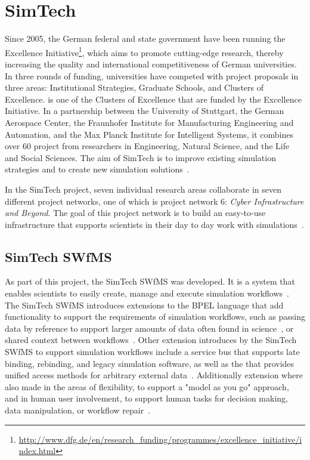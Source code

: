\section{SimTech}
\label{fundamentals:simtech}

Since 2005, the German federal and state government have been running the Excellence Initiative\footnote{\url{http://www.dfg.de/en/research_funding/programmes/excellence_initiative/index.html}}, which aims to promote cutting-edge research, thereby increasing the quality and international competitiveness of German universities.
In three rounds of funding, universities have competed with project proposals in three areas: Institutional Strategies, Graduate Schools, and Clusters of Excellence.
 is one of the Clusters of Excellence that are funded by the Excellence Initiative.
In a partnership between the University of Stuttgart, the German Aerospace Center, the Fraunhofer Institute for Manufacturing Engineering and Automation, and the Max Planck Institute for Intelligent Systems, it combines over 60 project from researchers in Engineering, Natural Science, and the Life and Social Sciences.
The aim of SimTech is to improve existing simulation strategies and to create new simulation solutions~\autocite{excellence:glance}.

In the SimTech project, seven individual research areas collaborate in seven different project networks, one of which is project network 6: \textit{Cyber Infrastructure and Beyond}.
The goal of this project network is to build an easy-to-use infrastructure that supports scientists in their day to day work with simulations~\autocite{simtech:projectnetwork6}.

\subsection{SimTech SWfMS}

As part of this project, the SimTech SWfMS was developed.
It is a system that enables scientists to easily create, manage and execute simulation workflows~\autocite{workflow:simulation:flexibility}.
The SimTech SWfMS introduces extensions to the BPEL language that add functionality to support the requirements of simulation workflows, such as passing data by reference to support larger amounts of data often found in science~\autocite[also~see][]{workflow:simulation:modelling:datareferences}, or shared context between workflows~\autocite{workflow:simulation:modelling}.
Other extension introduces by the SimTech SWfMS to support simulation workflows include a service bus that supports late binding, rebinding, and legacy simulation software, as well as the  that provides unified access methods for arbitrary external data~\autocite{workflow:simulation:runtime}.
Additionally extension where also made in the areas of flexibility, to support a "model as you go" approach, and in human user involvement, to support human tasks for decision making, data manipulation, or workflow repair~\autocites{workflow:simulation:flexibility}{workflow:simulation:humanusers}.

